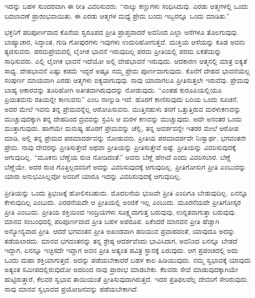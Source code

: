 \vskip 6pt

ಇದನ್ನು ಬಹಳ ಸುಂದರವಾಗಿ ಈ ರೀತಿ ವಿವರಿಸುವರು: “ನಾಲ್ಕು ಕಣ್ಣುಗಳು ಸಂಧಿಸಿದುವು. ಎರಡು ಆತ್ಮಗಳಲ್ಲಿ ಒಂದು ಬದಲಾವಣೆ ಪ್ರಾರಂಭವಾಯಿತು. ಈ ಎರಡು ಆತ್ಮಗಳ ಮಧ್ಯೆ ಪ್ರೇಮ ಬಂದು ಇಬ್ಬರನ್ನೂ ಒಂದು ಮಾಡಿತು.”

\vskip 6pt

ಭಕ್ತನಿಗೆ ಪರಿಪೂರ್ಣವಾದ ಕೊನೆಯ ಸ್ವರೂಪದ ಪ್ರೀತಿ ಪ್ರಾಪ್ತವಾದರೆ ಅವನಿಂದ ಎಲ್ಲಾ ಆಸೆಗಳೂ ತೊಲಗುವುವು. ಬಾಹ್ಯಾಚಾರ, ಸಿದ್ಧಾಂತ, ಗುಡಿ ಗೋಪುರಗಳು ಇವುಗಳು ಉದುರಿಹೋಗುತ್ತವೆ. ಮುಕ್ತಿಯ ಆಸೆಯನ್ನು ಕೂಡ ಅವನು ತ್ಯಜಿಸುವನು. ಪರಮಪ್ರೇಮದಲ್ಲಿ ಲೈಂಗಿಕ ಭಾವನೆ ಇರುವುದಿಲ್ಲ ಪರಮ ಪ್ರೀತಿಯಲ್ಲಿ ಪರಮ ಏಕತೆಯನ್ನು ಸಾಧಿಸುವರು. ಎಲ್ಲಿ ಲೈಂಗಿಕ ಭಾವನೆ ಇದೆಯೋ ಅಲ್ಲಿ ದೇಹಭಾವನೆ ಇರುವುದು. ಆದಕಾರಣ ಆತ್ಮನಲ್ಲಿ ಮಾತ್ರ ಐಕ್ಯತೆ ಸಾಧ್ಯ. ದೇಹಭಾವನೆ ಎಷ್ಟು ಕಡಮೆ ಇದ್ದರೆ ಅಷ್ಟೂ ನಮ್ಮ ಪ್ರೇಮ ಪೂರ್ಣವಾಗುವುದು. ಕೊನೆಗೆ ದೇಹದ ಭಾವನೆಯೆಲ್ಲ ಸಂಪುರ್ಣ ಮಾಯವಾಗಿ ಎರಡು ಆತ್ಮಗಳು ಐಕ್ಯವಾಗುವುವು. ನಾವು ಯಾವಾಗಲೂ ಪ್ರೀತಿಸುತ್ತಲೇ ಇರುವೆವು. ಪ್ರೇಮವು ಬಾಹ್ಯ ಆಕಾರವನ್ನು ತೂರಿಹೋಗಿ ಅತೀತವಾಗಿರುವುದನ್ನು ನೋಡುವುದು. “ಎಂತಹ ಕುರೂಪಿಯಲ್ಲಿಯೂ ಪ್ರಿಯತಮನು ರತಿಯನ್ನೇ ಕಾಣುವನು” ಎಂಬ ನಾಣ್ನುಡಿ ಇದೆ. ಹೊರಗೆ ಕಾಣಿಸುವುದು ಬರಿಯ ಒಂದು ಸೂಚನೆ. ಅದರ ಮೇಲೆ ಇವನು ತನ್ನ ಪ್ರೇಮವನ್ನೆಲ್ಲ ಆರೋಪಿಸುವನು. ಮುತ್ತಿನಹುಳು ತನಗೆ ಒತ್ತುತ್ತಿರುವ ಮರಳು\break ಕಣವನ್ನು ಮುಚ್ಚುವುದಕ್ಕಾಗಿ ತನ್ನ ದೇಹದಿಂದ ದ್ರವವನ್ನು ಸ್ರವಿಸಿ ಆ ಮರಳ ಕಣವನ್ನು ಮುಚ್ಚುವುದು. ಅದೇ ಅನಂತರ ಒಂದು ಮುತ್ತಾಗುವುದು. ಹಾಗೆಯೇ ಮನುಷ್ಯ ಹೊರಗೆ ಪ್ರೇಮವನ್ನು ಚೆಲ್ಲಿ, ತನ್ನ ಆದರ್ಶವನ್ನೇ ಇತರರ ಮೇಲೆ ಆರೋಪ ಮಾಡಿ, ಅಲ್ಲಿ ತನ್ನ ಪ್ರೇಮದ ಪರಮಾದರ್ಶವನ್ನು ನೋಡುವನು. ಪ್ರೀತಿಯ ಪರಮಾದರ್ಶವೇ ನಿಃಸ್ವಾರ್ಥ, ಭಗವಂತನೇ ಪ್ರೇಮ. ನಾವು ದೇವರನ್ನು ಪ್ರೀತಿಸುತ್ತೇವೆ ಅಥವಾ ಪ್ರೀತಿಯನ್ನು ಪ್ರೀತಿಸುತ್ತೇವೆ ಅಷ್ಟೆ. ಪ್ರೀತಿಯನ್ನು ವಿವರಿಸುವುದಕ್ಕೆ ಆಗುವುದಿಲ್ಲ. “ಮೂಕನು ಬೆಣ್ಣೆಯ ರುಚಿ ನೋಡಿದಂತೆ.” ಅವನು ಬೆಣ್ಣೆ ಹೇಗಿದೆ ಎಂದು ವಿವರಿಸಲಾರ. ಬೆಣ್ಣೆ ಬೆಣ್ಣೆಯೇ. ಅದರ ರುಚಿ ಗೊತ್ತಿಲ್ಲದವರಿಗೆ ಅದನ್ನು ವಿವರಿಸುವುದಕ್ಕೆ ಆಗುವುದಿಲ್ಲ. ಪ್ರೀತಿಗೋಸುಗ ಪ್ರೀತಿ ಎಂಬುದನ್ನು ಯಾರು ಅನುಭವಿಸಿಲ್ಲವೋ ಅವರಿಗೆ ಯಾರೂ ಇದನ್ನು ವಿವರಿಸುವುದಕ್ಕೆ ಆಗುವುದಿಲ್ಲ.

\vskip 0.2cm

ಪ್ರೀತಿಯನ್ನು ಒಂದು ತ್ರಿಭುಜಕ್ಕೆ ಹೋಲಿಸಬಹುದು. ಮೊದಲನೆಯ ಭುಜವೇ ಪ್ರೀತಿ ಎಂದಿಗೂ ಬೇಡುವುದಿಲ್ಲ. ಏನನ್ನೂ ಕೇಳುವುದಿಲ್ಲ ಎಂಬುದು. ಎರಡನೆಯದೇ ಆ ಪ್ರೀತಿಯಲ್ಲಿ ಅಂಜಿಕೆ ಇಲ್ಲ ಎಂಬುದು. ಮೂರನೆಯದೇ ಪ್ರೀತಿಗೋಸ್ಕರ ಪ್ರೀತಿ ಎಂಬುದು. ಪ್ರೀತಿಯ ಶಕ್ತಿಯಿಂದ ಇಂದ್ರಿಯಗಳು ಸೂಕ್ಷ್ಮವಾಗುತ್ತ ಬರುವುವು, ಉನ್ನತವಾಗುತ್ತಾ ಬರುವುವು. ಮಾನವ ಸಂಬಂಧದಲ್ಲಿ ಪರಿಪೂರ್ಣವಾದ ಪ್ರೀತಿ ಬಹಳ ಅಪರೂಪ. ಏಕೆಂದರೆ ಮಾನವನ ಪ್ರೀತಿ ಹೆಚ್ಚಾಗಿ ಅನ್ಯೋನ್ಯವಾದ ಪ್ರೀತಿ. ಆದರೆ ಭಗವಂತನ ಪ್ರೀತಿ ಅಖಂಡವಾಗಿ ಹರಿಯುವ ಪ್ರವಾಹದಂತೆ, ಯಾವುದೂ ಅದನ್ನು ತಡೆಯಲಾರದು. ಮಾನವ ಭಗವಂತನನ್ನು ತನ್ನ ಶ್ರೇಷ್ಠ ಆದರ್ಶವೆಂದು ಭಾವಿಸಿದಾಗ, ಅವನಿಂದ ಏನನ್ನೂ ಬೇಡದೆ ಇದ್ದಾಗ, ಏನನ್ನೂ ಇಚ್ಛಿಸದೇ ಇದ್ದಾಗ ಅವನ ಪ್ರೀತಿ ಅತ್ಯಂತ ಪವಿತ್ರ ಸ್ಥಾನಕ್ಕೆ ಏರುವುದು. ಆಗ ಪ್ರಪಂಚದಲ್ಲಿ ಅದು ಒಂದು ಮಹಾ ಶಕ್ತಿಯಾಗುತ್ತದೆ. ಅದನ್ನು ಪಡೆಯಬೇಕಾದರೆ ಬಹಳ ಕಾಲ ಹಿಡಿಯುವುದು. ನಮ್ಮ ಸ್ವಭಾವಕ್ಕೆ ಯಾವುದು ಅತ್ಯಂತ ಸಮೀಪದಲ್ಲಿರುವುದೋ ಅದರಿಂದ ನಾವು ಪ್ರಾರಂಭ ಮಾಡಬೇಕು. ಕೆಲವರು ಸೇವೆ ಮಾಡುವುದಕ್ಕಾಗಿಯೇ ಹುಟ್ಟಿರುತ್ತಾರೆ, ಕೆಲವರ ಸ್ವಭಾವ ತಾಯಿಯಂತೆ ಪ್ರೀತಿಸುವುದಾಗಿರುತ್ತದೆ. ಇದರ ಪ್ರತಿಫಲವೆಲ್ಲ ದೇವರಿಗೆ ಸೇರಿರುವುದು. ನಾವು ಮಾನವ ಸ್ವಭಾವದ ಪ್ರಯೋಜನವನ್ನು ಪಡೆಯಬೇಕಾಗಿದೆ.

